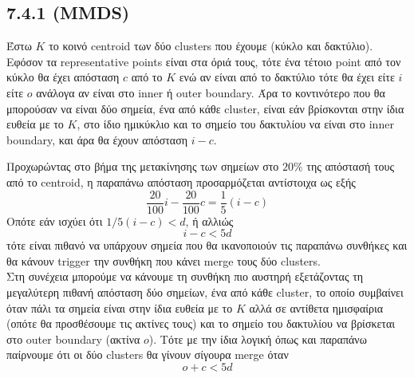 \documentclass[a4paper,11pt]{article}
\begin{document}


\subsection*{7.4.1 (MMDS)}

Έστω $K$ το κοινό centroid των δύο clusters που έχουμε (κύκλο και δακτύλιο).
Εφόσον τα representative points είναι στα όριά τους, τότε ένα τέτοιο point από τον κύκλο θα έχει απόσταση $c$ από το $K$ ενώ αν είναι από το δακτύλιο τότε θα έχει είτε $i$ είτε $o$ ανάλογα αν είναι στο inner ή outer boundary.
Άρα το κοντινότερο που θα μπορούσαν να είναι δύο σημεία, ένα από κάθε cluster, είναι εάν βρίσκονται στην ίδια ευθεία με το $K$, στο ίδιο ημικύκλιο και το σημείο του δακτυλίου να είναι στο inner boundary, και άρα θα έχουν απόσταση $i-c$.

Προχωρώντας στο βήμα της μετακίνησης των σημείων στο $20\%$ της απόστασή τους από το centroid, η παραπάνω απόσταση προσαρμόζεται αντίστοιχα ως εξής
\[ \frac{20}{100}i-\frac{20}{100}c = \frac{1}{5}(i-c) \]
Οπότε εάν ισχύει ότι $1/5(i-c)<d$, ή αλλιώς
\[ i-c < 5d \]
τότε είναι πιθανό να υπάρχουν σημεία που θα ικανοποιούν τις παραπάνω συνθήκες και θα κάνουν trigger την συνθήκη που κάνει merge τους δύο clusters.
\\[8pt]
Στη συνέχεια μπορούμε να κάνουμε τη συνθήκη πιο αυστηρή εξετάζοντας τη μεγαλύτερη πιθανή απόσταση δύο σημείων, ένα από κάθε cluster, το οποίο συμβαίνει όταν πάλι τα σημεία είναι στην ίδια ευθεία με το $K$ αλλά σε αντίθετα ημισφαίρια (οπότε θα προσθέσουμε τις ακτίνες τους) και το σημείο του δακτυλίου να βρίσκεται στο outer boundary (ακτίνα $o$).
Τότε με την ίδια λογική όπως και παραπάνω παίρνουμε ότι οι δύο clusters θα γίνουν σίγουρα merge όταν
\[ o+c < 5d \]
\end{document}
